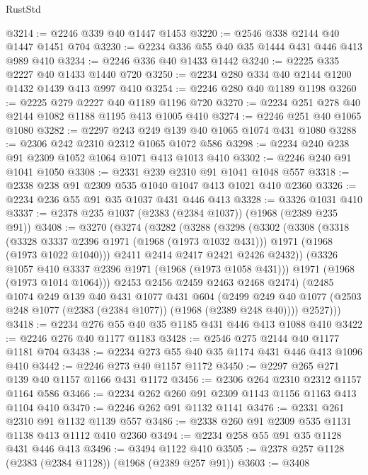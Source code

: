 \begin{lexlean}{RustStd}
\begin{coremodule}
{\begin{coremodule}
{{{{{@3214 := @2246 @339 @40 @1447 @1453
@3220 := @2546 @338 @2144 @40 @1447 @1451 @704
@3230 := @2234 @336 @55 @40 @35 @1444 @431 @446 @413 @989 @410
@3234 := @2246 @336 @40 @1433 @1442
@3240 := @2225 @335 @2227 @40 @1433 @1440 @720
@3250 := @2234 @280 @334 @40 @2144 @1200 @1432 @1439 @413 @997 @410
@3254 := @2246 @280 @40 @1189 @1198
@3260 := @2225 @279 @2227 @40 @1189 @1196 @720
@3270 := @2234 @251 @278 @40 @2144 @1082 @1188 @1195 @413 @1005 @410
@3274 := @2246 @251 @40 @1065 @1080
@3282 := @2297 @243 @249 @139 @40 @1065 @1074 @431 @1080
@3288 := @2306 @242 @2310 @2312 @1065 @1072 @586
@3298 := @2234 @240 @238 @91 @2309 @1052 @1064 @1071 @413 @1013 @410
@3302 := @2246 @240 @91 @1041 @1050
@3308 := @2331 @239 @2310 @91 @1041 @1048 @557
@3318 := @2338 @238 @91 @2309 @535 @1040 @1047 @413 @1021 @410 @2360
@3326 := @2234 @236 @55 @91 @35 @1037 @431 @446 @413
@3328 := @3326 @1031 @410
@3337 := @2378 @235 @1037 (@2383 (@2384 @1037)) (@1968 (@2389 @235 @91))
@3408 := @3270
    (@3274
      (@3282
        (@3288
          (@3298
            (@3302
              (@3308
                (@3318
                  (@3328 @3337 @2396 @1971 (@1968 (@1973 @1032 @431)))
                  @1971
                  (@1968 (@1973 @1022 @1040)))
                @2411
                @2414
                @2417
                @2421
                @2426
                @2432))
            (@3326 @1057 @410 @3337 @2396 @1971 (@1968 (@1973 @1058 @431)))
            @1971
            (@1968 (@1973 @1014 @1064)))
          @2453
          @2456
          @2459
          @2463
          @2468
          @2474)
        (@2485
          @1074
          @249
          @139
          @40
          @431
          @1077
          @431
          @604
          (@2499 @249 @40 @1077 (@2503 @248 @1077 (@2383 (@2384 @1077)) (@1968 (@2389 @248 @40))))
          @2527)))
@3418 := @2234 @276 @55 @40 @35 @1185 @431 @446 @413 @1088 @410
@3422 := @2246 @276 @40 @1177 @1183
@3428 := @2546 @275 @2144 @40 @1177 @1181 @704
@3438 := @2234 @273 @55 @40 @35 @1174 @431 @446 @413 @1096 @410
@3442 := @2246 @273 @40 @1157 @1172
@3450 := @2297 @265 @271 @139 @40 @1157 @1166 @431 @1172
@3456 := @2306 @264 @2310 @2312 @1157 @1164 @586
@3466 := @2234 @262 @260 @91 @2309 @1143 @1156 @1163 @413 @1104 @410
@3470 := @2246 @262 @91 @1132 @1141
@3476 := @2331 @261 @2310 @91 @1132 @1139 @557
@3486 := @2338 @260 @91 @2309 @535 @1131 @1138 @413 @1112 @410 @2360
@3494 := @2234 @258 @55 @91 @35 @1128 @431 @446 @413
@3496 := @3494 @1122 @410
@3505 := @2378 @257 @1128 (@2383 (@2384 @1128)) (@1968 (@2389 @257 @91))
@3603 := @3408
}}}}}
\end{coremodule}}
\end{coremodule}
\end{lexlean}
